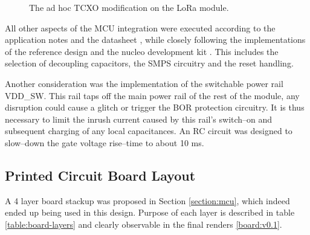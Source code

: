 \begin{figure}
    \centering
     \hfil
    \caption{\label{fig:tcxo-bodge}The ad hoc TCXO modification on the LoRa module.}
\end{figure}

All other aspects of the MCU integration were executed according to the application notes and the datasheet  \cite{stmicroelectronics_stm32wle5xx_nodate,stmicroelectronics_how_nodate-1}, while closely following the implementations of the reference design and the nucleo development kit \cite{stmicroelectronics_stdes-wl5u4ilh_2024,stmicroelectronics_nucleo-wl55jc_2024}. This includes the selection of decoupling capacitors, the SMPS circuitry and the reset handling.

Another consideration was the implementation of the switchable power rail VDD\_SW. This rail taps off the main power rail of the rest of the module, any disruption could cause a glitch or trigger the BOR protection circuitry. It is thus necessary to limit the inrush current caused by this rail's switch--on and subsequent charging of any local capacitances. An RC circuit was designed to slow--down the gate voltage rise--time to about 10 ms.

\subsection{Printed Circuit Board Layout}
A 4 layer board stackup was proposed in Section \ref{section:mcu}, which indeed ended up being used in this design. Purpose of each layer is described in table \ref{table:board-layers} and clearly observable in the final renders \ref{board:v0.1}.

